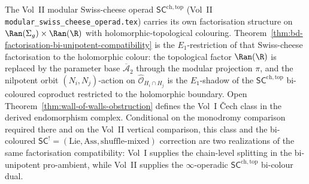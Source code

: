 \begin{remark}
\label{rem:vol2-sc-factorisation-comparison}
%
The Vol~II modular Swiss-cheese operad
$\mathsf{SC}^{\mathrm{ch,top}}$
\textup{(}Vol~II
\texttt{modular\_swiss\_cheese\_operad.tex}\textup{)} carries its own
factorisation structure on
$\Ran(\Sigma_g)\times\Ran(\R)$ with holomorphic-topological colouring.
Theorem~\textup{\ref{thm:bd-factorisation-bi-unipotent-compatibility}}
is the $E_1$-restriction of that Swiss-cheese factorisation to the
holomorphic colour: the topological factor $\Ran(\R)$ is replaced by
the parameter base $\overline{\mathcal A}_2$ through the modular
projection $\pi$, and the nilpotent orbit $(N_i,N_j)$-action on
$\widehat{\mathcal O}_{H_i\cap H_j}$ is the $E_1$-shadow of the
$\mathsf{SC}^{\mathrm{ch,top}}$ bi-coloured coproduct restricted to
the holomorphic boundary.  Open
Theorem~\textup{\ref{thm:wall-of-walls-obstruction}} defines the Vol~I
\v Cech class in the derived endomorphism complex.  Conditional on the
monodromy comparison required there and on the Vol~II vertical
comparison, this class and the bi-coloured
$\mathsf{SC}^!=(\mathrm{Lie},\mathrm{Ass},
\mathrm{shuffle\text{-}mixed})$ correction are two realizations of the
same factorisation compatibility: Vol~I supplies the chain-level
splitting in the bi-unipotent pro-ambient, while Vol~II supplies the
$\infty$-operadic $\mathsf{SC}^{\mathrm{ch,top}}$ bi-colour dual.
\end{remark}

